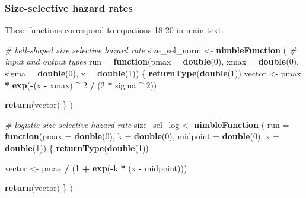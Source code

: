 \documentclass[
]{article}
\newenvironment{Shaded}{\begin{snugshade}}{\end{snugshade}}
\newcommand{\AttributeTok}[1]{\textcolor[rgb]{0.13,0.29,0.53}{#1}}
\newcommand{\CommentTok}[1]{\textcolor[rgb]{0.56,0.35,0.01}{\textit{#1}}}
\newcommand{\ControlFlowTok}[1]{\textcolor[rgb]{0.13,0.29,0.53}{\textbf{#1}}}
\newcommand{\DecValTok}[1]{\textcolor[rgb]{0.00,0.00,0.81}{#1}}
\newcommand{\FunctionTok}[1]{\textcolor[rgb]{0.13,0.29,0.53}{\textbf{#1}}}
\newcommand{\NormalTok}[1]{#1}
\newcommand{\OtherTok}[1]{\textcolor[rgb]{0.56,0.35,0.01}{#1}}
\newcommand{\SpecialCharTok}[1]{\textcolor[rgb]{0.81,0.36,0.00}{\textbf{#1}}}
\begin{document}
\subsubsection{Size-selective hazard
rates}\label{size-selective-hazard-rates}

These functions correspond to equations 18-20 in main text.

\begin{Shaded}
\begin{Highlighting}[]
\CommentTok{\# bell{-}shaped size selective hazard rate}
\NormalTok{size\_sel\_norm }\OtherTok{\textless{}{-}} \FunctionTok{nimbleFunction}\NormalTok{ (}
  \CommentTok{\# input and output types}
  \AttributeTok{run =} \ControlFlowTok{function}\NormalTok{(}\AttributeTok{pmax =} \FunctionTok{double}\NormalTok{(}\DecValTok{0}\NormalTok{), }\AttributeTok{xmax =} \FunctionTok{double}\NormalTok{(}\DecValTok{0}\NormalTok{), }\AttributeTok{sigma =} \FunctionTok{double}\NormalTok{(}\DecValTok{0}\NormalTok{),}
                 \AttributeTok{x =} \FunctionTok{double}\NormalTok{(}\DecValTok{1}\NormalTok{))}
\NormalTok{  \{}
    \FunctionTok{returnType}\NormalTok{(}\FunctionTok{double}\NormalTok{(}\DecValTok{1}\NormalTok{))}
\NormalTok{      vector }\OtherTok{\textless{}{-}}\NormalTok{ pmax }\SpecialCharTok{*} \FunctionTok{exp}\NormalTok{(}\SpecialCharTok{{-}}\NormalTok{(x }\SpecialCharTok{{-}}\NormalTok{ xmax) }\SpecialCharTok{\^{}} \DecValTok{2} \SpecialCharTok{/}\NormalTok{ (}\DecValTok{2} \SpecialCharTok{*}\NormalTok{ sigma }\SpecialCharTok{\^{}} \DecValTok{2}\NormalTok{))}

    \FunctionTok{return}\NormalTok{(vector)}
\NormalTok{  \}}
\NormalTok{)}

\CommentTok{\# logistic size selective hazard rate}
\NormalTok{size\_sel\_log }\OtherTok{\textless{}{-}} \FunctionTok{nimbleFunction}\NormalTok{ (}
  \AttributeTok{run =} \ControlFlowTok{function}\NormalTok{(}\AttributeTok{pmax =} \FunctionTok{double}\NormalTok{(}\DecValTok{0}\NormalTok{), }\AttributeTok{k =} \FunctionTok{double}\NormalTok{(}\DecValTok{0}\NormalTok{), }\AttributeTok{midpoint =} \FunctionTok{double}\NormalTok{(}\DecValTok{0}\NormalTok{),}
                 \AttributeTok{x =} \FunctionTok{double}\NormalTok{(}\DecValTok{1}\NormalTok{))}
\NormalTok{  \{}
    \FunctionTok{returnType}\NormalTok{(}\FunctionTok{double}\NormalTok{(}\DecValTok{1}\NormalTok{))}
    
\NormalTok{    vector }\OtherTok{\textless{}{-}}\NormalTok{ pmax }\SpecialCharTok{/}\NormalTok{ (}\DecValTok{1} \SpecialCharTok{+} \FunctionTok{exp}\NormalTok{(}\SpecialCharTok{{-}}\NormalTok{k }\SpecialCharTok{*}\NormalTok{ (x }\SpecialCharTok{{-}}\NormalTok{ midpoint)))}

    \FunctionTok{return}\NormalTok{(vector)}
\NormalTok{  \}}
\NormalTok{)}
\end{Highlighting}
\end{Shaded}
\end{document}
